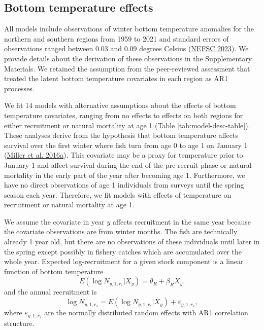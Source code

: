 \documentclass[
]{article}
\begin{document}
\hypertarget{bottom-temperature-effects}{%
\subsection*{Bottom temperature effects}\label{bottom-temperature-effects}}

All models include observations of winter bottom temperature anomalies for the northern and southern regions from 1959 to 2021 and standard errors of observations ranged between 0.03 and 0.09 degrees Celsius (\protect\hyperlink{ref-nefsc23}{NEFSC 2023}). We provide details about the derivation of these observations in the Supplementary Materials. We retained the assumption from the peer-reviewed assessment that treated the latent bottom temperature covariates in each region as AR1 processes.

We fit 14 models with alternative assumptions about the effects of bottom temperature covariates, ranging from no effects to effects on both regions for either recruitment or natural mortality at age 1 (Table \ref{tab:model-desc-table}). These analyses derive from the hypothesis that bottom temperature affects survival over the first winter where fish turn from age 0 to age 1 on January 1 (\protect\hyperlink{ref-milleretal16_yoy_survival}{Miller et al. 2016a}). This covariate may be a proxy for temperature prior to January 1 and affect survival during the end of the pre-recruit phase or natural mortality in the early part of the year after becoming age 1. Furthermore, we have no direct observations of age 1 individuals from surveys until the spring season each year. Therefore, we fit models with effects of temperature on recruitment or natural mortality at age 1.

We assume the covariate in year \(y\) affects recruitment in the same year because the covariate observations are from winter months. The fish are technically already 1 year old, but there are no observations of these individuals until later in the spring except possibly in fishery catches which are accumulated over the whole year. Expected log-recruitment for a given stock component is a linear function of bottom temperature
\begin{equation}\label{eq:expected-recruitment}
E\left(\log N_{y,1,r_s}|X_{y}\right) = \theta_{R} + \beta_{R} X_y.
\end{equation}
and the annual recruitment is
\begin{equation}\label{eq:Rec-re}
\log N_{y,1,r_s} = E\left(\log N_{y,1,r_s}|X_y\right) + \varepsilon_{y,1,r_s},
\end{equation}
where \(\varepsilon_{y,1,r_s}\) are the normally distributed random effects with AR1 correlation structure.
\end{document}
